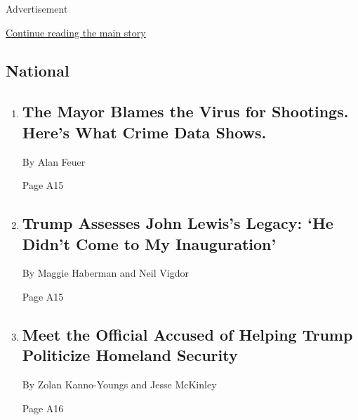 Advertisement

\protect\hyperlink{after-mid2}{Continue reading the main story}

\hypertarget{national}{%
\subsection{National}\label{national}}

\begin{enumerate}
\def\labelenumi{\arabic{enumi}.}
\item
  \href{/2020/08/04/nyregion/nyc-shootings-coronavirus.html}{}

  \hypertarget{the-mayor-blames-the-virus-for-shootings-heres-what-crime-data-shows}{%
  \subsection{The Mayor Blames the Virus for Shootings. Here's What
  Crime Data
  Shows.}\label{the-mayor-blames-the-virus-for-shootings-heres-what-crime-data-shows}}

  By Alan Feuer

  Page A15
\item
  \href{/2020/08/04/us/politics/trump-john-lewis-axios.html}{}

  \hypertarget{trump-assesses-john-lewiss-legacy-he-didnt-come-to-my-inauguration}{%
  \subsection{Trump Assesses John Lewis's Legacy: `He Didn't Come to My
  Inauguration'}\label{trump-assesses-john-lewiss-legacy-he-didnt-come-to-my-inauguration}}

  By Maggie Haberman and Neil Vigdor

  Page A15
\item
  \href{/2020/08/04/us/politics/trump-homeland-security.html}{}

  \hypertarget{meet-the-official-accused-of-helping-trump-politicize-homeland-security-1}{%
  \subsection{Meet the Official Accused of Helping Trump Politicize
  Homeland
  Security}\label{meet-the-official-accused-of-helping-trump-politicize-homeland-security-1}}

  By Zolan Kanno-Youngs and Jesse McKinley

  Page A16
\end{enumerate}

